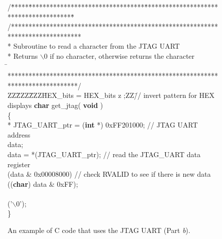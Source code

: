 \begin{figure}[h!]
\begin{center}
\begin{minipage}[t]{12.5 cm}
\begin{tabbing}
/\=*****\=*********************************\=****************************************\=\kill
/********************************************************************************\\
\>* Subroutine to read a character from the JTAG UART\\
\>* Returns $\backslash$0 if no character, otherwise returns the character\\
\=\kill
\>********************************************************************************/\\
ZZ\=ZZZ\=ZZZ\=HEX\_bits = HEX\_bits z ;ZZ\=// invert pattern for HEX displays\kill
{\bf char} get\_jtag( {\bf void} )\\
\{\\
 * JTAG\_UART\_ptr	= ({\bf int} *) 0xFF201000;	// JTAG UART address\\
 data;\\
\>data = *(JTAG\_UART\_ptr); \>\>\>// read the JTAG\_UART data register\\
 (data \& 0x00008000) \>\>\>// check RVALID to see if there is new data\\
\> (({\bf char}) data \& 0xFF);\\
\\
\> ('$\backslash$0');\\
\}
\end{tabbing}
\end{minipage}
\end{center}
	\vspace{-0.33in}\caption{An example of C code that uses the JTAG UART (Part {\it b}).}
   \label{fig:jtag_uart_C}
\end{figure}